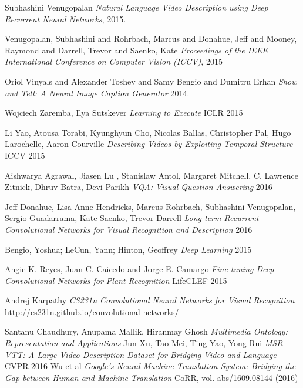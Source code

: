 \documentclass[12pt]{article}
\begin{document}
	\begin{thebibliography}{1}
	
	   Subhashini Venugopalan {\em Natural Language Video Description using Deep Recurrent Neural Networks}, 2015.
	
	    Venugopalan, Subhashini and Rohrbach, Marcus and Donahue, Jeff
                    and Mooney, Raymond and Darrell, Trevor and Saenko, Kate {\em Proceedings of the IEEE International Conference on Computer Vision (ICCV)}, 2015
	
	   Oriol Vinyals and
               Alexander Toshev and
               Samy Bengio and
               Dumitru Erhan {\em Show and Tell: {A} Neural Image Caption Generator} 2014.

         Wojciech Zaremba, Ilya Sutskever {\em Learning to Execute} ICLR 2015
         

           Li Yao, Atousa Torabi, Kyunghyun Cho, Nicolas Ballas, Christopher Pal, Hugo Larochelle, Aaron Courville {\em Describing Videos by Exploiting Temporal Structure} ICCV 2015
        

          Aishwarya Agrawal, Jiasen Lu , Stanislaw Antol,
		Margaret Mitchell, C. Lawrence Zitnick, Dhruv Batra, Devi Parikh {\em VQA: Visual Question Answering} 2016
        

          Jeff Donahue, Lisa Anne Hendricks, Marcus Rohrbach, Subhashini Venugopalan, Sergio Guadarrama, Kate Saenko, Trevor Darrell {\em Long-term Recurrent Convolutional Networks for Visual Recognition and Description} 2016

          Bengio, Yoshua; LeCun, Yann; Hinton, Geoffrey {\em Deep Learning} 2015

          Angie K. Reyes, Juan C. Caicedo and Jorge E. Camargo {\em Fine-tuning Deep Convolutional Networks for
		Plant Recognition} LifeCLEF 2015

          Andrej Karpathy {\em 
			CS231n Convolutional Neural Networks for Visual Recognition
		} http://cs231n.github.io/convolutional-networks/

		 Santanu Chaudhury, Anupama Mallik, Hiranmay Ghosh {\em Multimedia Ontology: Representation and Applications
		} 
		   Jun Xu, Tao Mei,  Ting Yao,  Yong Rui {\em MSR-VTT: A Large Video Description Dataset for Bridging Video and Language} CVPR 2016
		Wu et al
		{ \em Google's Neural Machine Translation System: Bridging the Gap between Human and Machine Translation} CoRR, vol. abs/1609.08144 (2016)
		

\end{thebibliography}
\end{document}
